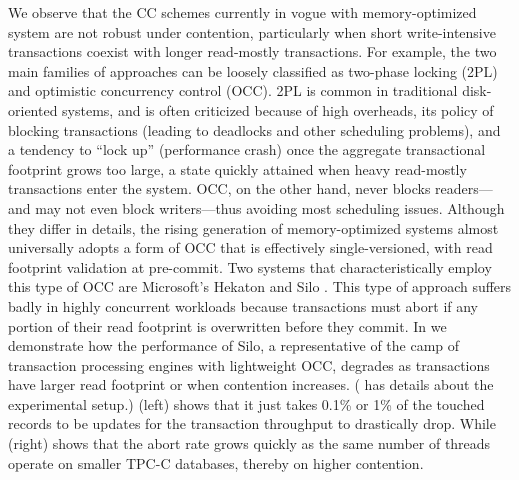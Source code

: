 We observe that the CC schemes currently in vogue with memory-optimized system are not robust under contention, particularly when short write-intensive transactions coexist with longer read-mostly transactions.
For example, the two main families of approaches can be loosely classified as two-phase locking (2PL) and optimistic concurrency control (OCC). 2PL is common in traditional disk-oriented systems, and is often criticized because of high overheads, its policy of blocking transactions (leading to deadlocks and other scheduling problems), and a tendency to ``lock up'' (performance crash) once the aggregate transactional footprint grows too large, a state quickly attained when heavy read-mostly transactions enter the system. OCC, on the other hand, never blocks readers---and may not even block writers---thus avoiding most scheduling issues. Although they differ in details, the rising generation of memory-optimized systems almost universally adopts a form of OCC that is effectively single-versioned, with read footprint validation at pre-commit.  Two systems that characteristically employ this type of OCC are Microsoft's Hekaton \cite{LarsonBDFPZ11} and Silo \cite{TuZKLM13}. This type of approach suffers badly in highly concurrent workloads because transactions must abort if any portion of their read footprint is overwritten before they commit. 
In  we demonstrate how the performance of Silo, a representative of the camp of transaction processing engines with lightweight OCC, degrades as transactions have larger read footprint or when contention increases. ( has details about the experimental setup.) (left) shows that it just takes 0.1\% or 1\% of the touched records to be updates for the transaction throughput to drastically drop. While (right) shows that the abort rate grows quickly as the same number of threads operate on smaller TPC-C databases, thereby on higher contention.


